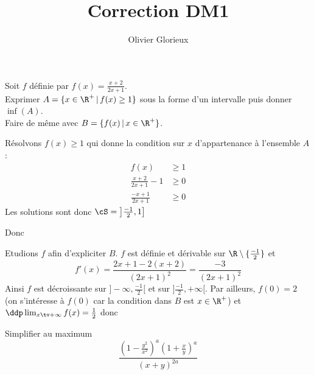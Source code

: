 \documentclass[a4paper, 11pt,reqno]{article}
\author{Olivier Glorieux}
\begin{document}
\title{Correction DM1 \\
}
\begin{exercice}
Soit $f$ définie par $f(x) = \frac{x+2}{2x+1}$.\\
Exprimer $A=\{ x\in \R^+\,| \, f(x) \geq 1\}$ sous la forme d'un intervalle puis donner $\inf(A)$. \\
Faire de même avec $B=\{ f(x)\,| \, x \in\R^+\}$.

\end{exercice}


\begin{correction}
Résolvons $f(x) \geq 1$ qui donne la condition sur $x$ d'appartenance à l'ensemble $A$:
\begin{align*}
f(x) &\geq 1 \\
\frac{x+2}{2x+1}-1 &\geq 0\\
\frac{-x+1}{2x+1} &\geq 0
\end{align*}
Les solutions sont donc 
$\cS = \left]\frac{-1}{2}, 1\right]$

Donc 
\begin{center}
\fbox{$A=\R^+\cap  \left]\frac{-1}{2}, 1\right] = [0,1]$ et $\inf A =0$}
\end{center}

Etudions $f$ afin d'expliciter $B$. 
$f$ est définie et  dérivable  sur $\R\setminus\{ \frac{-1}{2}\}$ et 
$$f'(x) = \frac{2x+1 - 2(x+2)}{(2x+1)^2}= \frac{-3}{(2x+1)^2}$$
Ainsi $f$ est décroissante sur $]-\infty, \frac{-1}{2}[ $ et sur $]\frac{-1}{2}, +\infty[$. 
Par ailleurs, $f(0) = 2$ (on s'intéresse à $f(0)$  car la condition dans $B$ est $x\in \R^+$) et $\ddp \lim_{x\tv +\infty } f(x) = \frac{1}{2}$
donc

\begin{center}
\fbox{$B= \left]\frac{1}{2},2\right]$ et $\inf(B) = \frac{1}{2}$}
\end{center}


\end{correction}





\begin{exercice}
Simplifier au maximum
$$\frac{\left(1-\frac{y^2}{x^2}\right)^a\left(1+\frac{x}{y}\right)^a }{(x+y)^{2a}}$$
\end{exercice}
\end{document}
